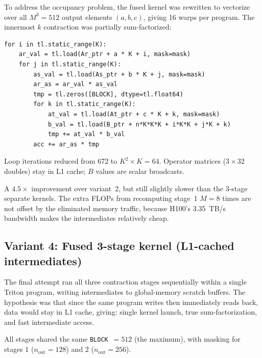 \documentclass[11pt]{article}
\begin{document}
To address the occupancy problem, the fused kernel was rewritten to
vectorize over all $M^3 = 512$ output elements $(a,b,c)$, giving 16
warps per program.  The innermost $k$ contraction was partially
sum-factorized:

\begin{lstlisting}
for i in tl.static_range(K):
    ar_val = tl.load(Ar_ptr + a * K + i, mask=mask)
    for j in tl.static_range(K):
        as_val = tl.load(As_ptr + b * K + j, mask=mask)
        ar_as = ar_val * as_val
        tmp = tl.zeros([BLOCK], dtype=tl.float64)
        for k in tl.static_range(K):
            at_val = tl.load(At_ptr + c * K + k, mask=mask)
            b_val = tl.load(B_ptr + n*K*K*K + i*K*K + j*K + k)
            tmp += at_val * b_val
        acc += ar_as * tmp
\end{lstlisting}

Loop iterations reduced from 672 to $K^2 \times K = 64$.
Operator matrices ($3 \times 32$ doubles) stay in L1 cache; $B$ values
are scalar broadcasts.

\begin{center}
\end{center}

A $4.5\times$ improvement over variant~2, but still slightly slower than the
3-stage separate kernels.  The extra FLOPs from recomputing stage~1
$M=8$ times are not offset by the eliminated memory traffic, because
H100's 3.35~TB/s bandwidth makes the intermediates relatively cheap.

\subsection{Variant 4: Fused 3-stage kernel (L1-cached intermediates)}

The final attempt ran all three contraction stages sequentially within
a single Triton program, writing intermediates to global-memory scratch
buffers.  The hypothesis was that since the same program writes then
immediately reads back, data would stay in L1 cache, giving: single
kernel launch, true sum-factorization, and fast intermediate access.

All stages shared the same \texttt{BLOCK}~$= 512$ (the maximum),
with masking for stages 1 ($n_\text{out} = 128$) and 2
($n_\text{out} = 256$).
\end{document}

